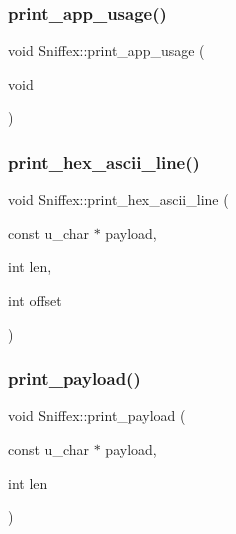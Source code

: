 \mbox{\label{classSniffex_aea81794fe2ac6e2b857eef01c3b109e5}} 
\subsubsection{\texorpdfstring{print\+\_\+app\+\_\+usage()}{print\_app\_usage()}}
{\footnotesize\ttfamily void Sniffex\+::print\+\_\+app\+\_\+usage (\begin{DoxyParamCaption}\item[{void}]{ }\end{DoxyParamCaption})}

\mbox{\label{classSniffex_aec1e34cb4b2ff906304f957c205707ea}} 
\subsubsection{\texorpdfstring{print\+\_\+hex\+\_\+ascii\+\_\+line()}{print\_hex\_ascii\_line()}}
{\footnotesize\ttfamily void Sniffex\+::print\+\_\+hex\+\_\+ascii\+\_\+line (\begin{DoxyParamCaption}\item[{const u\+\_\+char $\ast$}]{payload,  }\item[{int}]{len,  }\item[{int}]{offset }\end{DoxyParamCaption})}

\mbox{\label{classSniffex_a1b24163d441d38f3672800c3de85d149}} 
\subsubsection{\texorpdfstring{print\+\_\+payload()}{print\_payload()}}
{\footnotesize\ttfamily void Sniffex\+::print\+\_\+payload (\begin{DoxyParamCaption}\item[{const u\+\_\+char $\ast$}]{payload,  }\item[{int}]{len }\end{DoxyParamCaption})}

